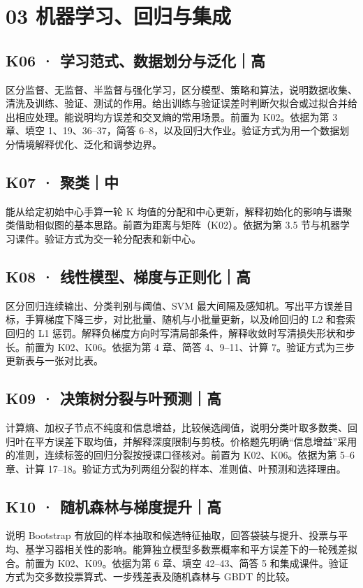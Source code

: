 \documentclass[UTF8,a4paper,11pt]{ctexart}
\begin{document}
\section{03 机器学习、回归与集成}
\subsection{K06 · 学习范式、数据划分与泛化｜高}
区分监督、无监督、半监督与强化学习，区分模型、策略和算法，说明数据收集、清洗及训练、验证、测试的作用。给出训练与验证误差时判断欠拟合或过拟合并给出相应处理。能说明均方误差和交叉熵的常用场景。前置为 K02。依据为第 3 章、填空 1、19、36–37，简答 6–8，以及回归大作业。验证方式为用一个数据划分情境解释优化、泛化和调参边界。

\subsection{K07 · 聚类｜中}
能从给定初始中心手算一轮 K 均值的分配和中心更新，解释初始化的影响与谱聚类借助相似图的基本思路。前置为距离与矩阵（K02）。依据为第 3.5 节与机器学习课件。验证方式为交一轮分配表和新中心。

\subsection{K08 · 线性模型、梯度与正则化｜高}
区分回归连续输出、分类判别与阈值、SVM 最大间隔及感知机。写出平方误差目标，手算梯度下降三步，对比批量、随机与小批量更新，以及岭回归的 L2 和套索回归的 L1 惩罚。解释负梯度方向时写清局部条件，解释收敛时写清损失形状和步长。前置为 K02、K06。依据为第 4 章、简答 4、9–11、计算 7。验证方式为三步更新表与一张对比表。

\subsection{K09 · 决策树分裂与叶预测｜高}
计算熵、加权子节点不纯度和信息增益，比较候选阈值，说明分类叶取多数类、回归叶在平方误差下取均值，并解释深度限制与剪枝。价格题先明确“信息增益”采用的准则，连续标签的回归分裂按授课口径核对。前置为 K02、K06。依据为第 5–6 章、计算 17–18。验证方式为列两组分裂的样本、准则值、叶预测和选择理由。

\subsection{K10 · 随机森林与梯度提升｜高}
说明 Bootstrap 有放回的样本抽取和候选特征抽取，回答袋装与提升、投票与平均、基学习器相关性的影响。能算独立模型多数票概率和平方误差下的一轮残差拟合。前置为 K02、K09。依据为第 6 章、填空 42–43、简答 5 和集成课件。验证方式为交多数投票算式、一步残差表及随机森林与 GBDT 的比较。
\end{document}

